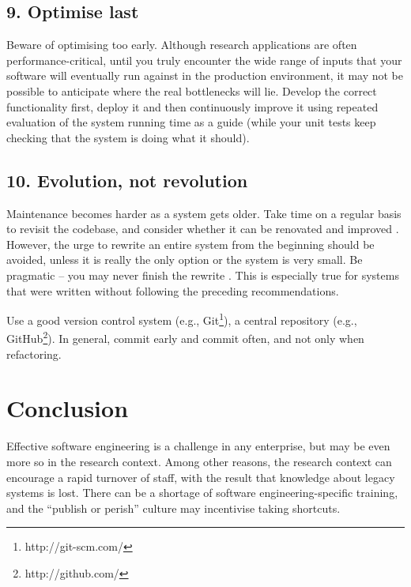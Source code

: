 \documentclass{bmcart}
\begin{document}
\subsection*{9. Optimise last}

Beware of optimising too early. Although research applications are often performance-critical, until you truly encounter the wide range of inputs that your software will eventually run against in the production environment, it may not be possible to anticipate where the real bottlenecks will lie. Develop the correct functionality first, deploy it and then continuously improve it using repeated evaluation of the system running time as a guide (while your unit tests keep checking that the system is doing what it should). 

\subsection*{10. Evolution, not revolution}

Maintenance becomes harder as a system gets older. Take time on a regular basis to revisit the codebase, and consider whether it can be renovated and improved \cite{refactoring}. However, the urge to rewrite an entire system from the beginning should be avoided, unless it is really the only option or the system is very small. Be pragmatic \cite{pragprog} -- you may never finish the rewrite \cite{brooks1975}. This is especially true for systems that were written without following the preceding recommendations. 

Use a good version control system (e.g., Git\footnote{http://git-scm.com/}), a central repository (e.g., GitHub\footnote{http://github.com/}). In general, commit early and commit often, and not only when refactoring. 


\section*{Conclusion}

Effective software engineering is a challenge in any enterprise, but may be even more so in the research context. Among other reasons, the research context can encourage a rapid turnover of staff, with the result that knowledge about legacy systems is lost. There can be a shortage of software engineering-specific training, and the ``publish or perish'' culture may incentivise taking shortcuts. 
\end{document}
